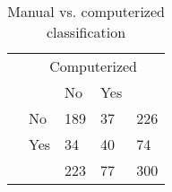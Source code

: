 \begin{table}
\begin{small}
\begin{threeparttable}
\caption{{\normalsize Manual vs. computerized classification}}
\begin{tabular}{ll|ll|l}
& \multicolumn{4}{c}{Computerized} \tabularnewline[0.1cm]
& & No & Yes &   \tabularnewline
\cline{2-5}
\parbox[t]{2mm}{} & No & 189 & 37 & 226 \tabularnewline
& Yes & 34 & 40 & 74 \tabularnewline
{}
&  & 223 & 77 & 300 \tabularnewline
\end{tabular}
\end{threeparttable}
\end{small}
\end{table}
